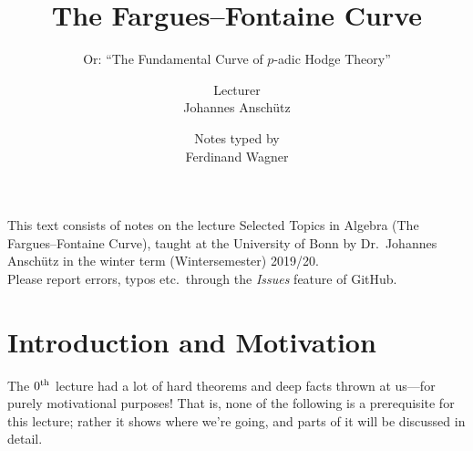 \documentclass[a4paper, 10pt, oneside, DIV=9, chapterprefix=true, numbers=enddot]{scrbook}
\title{The Fargues--Fontaine Curve}
\subtitle{Or: \enquote{The Fundamental Curve of $p$-adic Hodge Theory}}
\author{{\normalsize Lecturer}\\
	Johannes Anschütz}
\date{{\normalsize Notes typed by}\\
	Ferdinand Wagner}
\begin{document}
\frontmatter
{}
\maketitle
\noindent This text consists of notes on the lecture Selected Topics in Algebra (The Fargues--Fontaine Curve), taught at the University of
Bonn by Dr.\ Johannes Anschütz in the winter term (Wintersemester) 2019/20.\\[\thmsep]Please report errors, typos etc.\ through the \emph{Issues} feature of GitHub.


\tableofcontents
{}
\setcounter{llecture}{-1}
\chapter{Introduction and Motivation}
\renewcommand{\thedummy}{\thechapter.\thesection.\arabic{dummy}}
The $0^{\text{th}}$ lecture had a lot of hard theorems and deep facts thrown at us---for purely motivational purposes! That is, none of the following is a prerequisite for this lecture; rather it shows where we're going, and parts of it will be discussed in detail.
\end{document}
